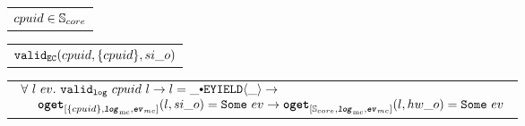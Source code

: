 


\begin{hypothesis}
\begin{tabular}{P{0.95\textwidth}}
$cpuid \in {\mathbb{S}_{core}}$
\end{tabular}
\end{hypothesis}

\begin{hypothesis}
\begin{tabular}{P{0.95\textwidth}}
${{\mathrm{\texttt{valid}}}_{{\mathrm{\texttt{EC}}}}}({cpuid}, {\{cpuid\}}, {si\_o})$
\end{tabular}
\end{hypothesis}


\begin{hypothesis}
\begin{tabular}{P{0.95\textwidth}}
$
\begin{array}{l}
\forall \ l \ ev  . \ \validlog{cpuid}{l} \rightarrow l = \listconsoppo{\yieldev{\_}}{\_} \rightarrow\\
\ \ \ \ \oget{\set{cpuid}}{\mclog}{\mcevent}{l}{si\_o}{ev} \rightarrow \oget{\coreset}{\mclog}{\mcevent}{l}{hw\_o}{ev} \\
\end{array}
$
\end{tabular}
\end{hypothesis}


